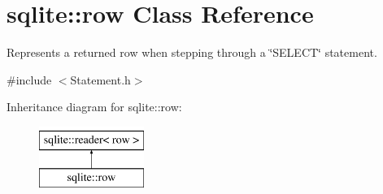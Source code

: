 \hypertarget{a00011}{\section{sqlite\-:\-:row Class Reference}
\label{a00011}
}


Represents a returned row when stepping through a \char`\"{}\-S\-E\-L\-E\-C\-T\char`\"{} statement.  




{\ttfamily \#include $<$Statement.\-h$>$}

Inheritance diagram for sqlite\-:\-:row\-:\begin{figure}[H]
\begin{center}
\leavevmode
\includegraphics[height=2.000000cm]{a00011}
\end{center}
\end{figure}
